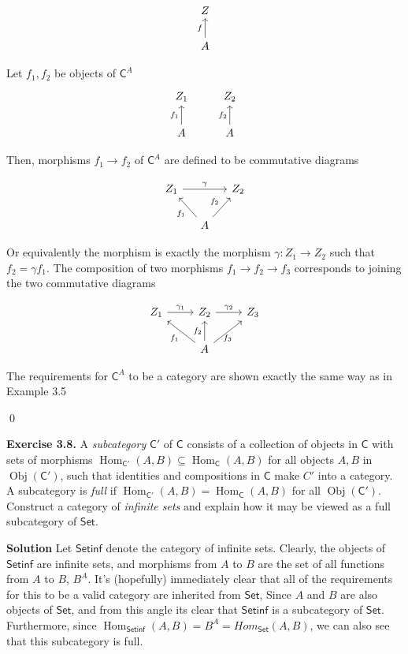 \documentclass[titlepage]{article}
\newcommand{\Exercise}[1]{\textbf{Exercise #1}}
\newcommand{\Solution}{\textbf{Solution }}
\newcommand{\cat}[1]{\mathsf{#1}}
\newcommand{\Cat}{\cat{C}}
\DeclareMathOperator{\Hom}{Hom}
\DeclareMathOperator{\Obj}{Obj}
\begin{document}
\[
\begin{tikzcd}
Z \\ A \arrow[u,"f"] 
\end{tikzcd}
\]

Let $f_1,f_2$ be objects of $\Cat^A$
\[
\begin{tikzcd}
    Z_1 & Z_2 \\ A \arrow[u,"f_1"] & A \arrow[u,"f_2"]
\end{tikzcd}
\]

Then, morphisms $f_1 \to f_2$ of $\Cat^A$ are defined to be commutative diagrams

\[
\begin{tikzcd}[column sep=small]
    Z_1 \arrow[rr,"\gamma"] & & Z_2 \\ & A \arrow[ul,"f_1"] \arrow[ur,"f_2"]
\end{tikzcd}
\]

Or equivalently the morphism is exactly the morphism $\gamma: Z_1 \to Z_2$ such that $f_2 = \gamma f_1$. The composition of two morphisms $f_1 \to f_2 \to f_3$ corresponds to joining the two commutative diagrams

\[
\begin{tikzcd}
    Z_1 \arrow[r,"\gamma_1"] & Z_2 \arrow[r,"\gamma_2"] & Z_3 \\ & A \arrow[ul,"f_1"] \arrow[u,"f_2"] \arrow[ur,"f_3" below]
\end{tikzcd}
\]

The requirements for $\Cat^A$ to be a category are shown exactly the same way as in Example 3.5

\qed
\bigskip

\Exercise{3.8.} A \textit{subcategory} $\Cat'$ of $\Cat$ consists of a collection of objects in $\Cat$ with sets of morphisms $\Hom_{\Cat'}(A,B) \subseteq \Hom_{\Cat}(A,B)$ for all objects $A,B$ in $\Obj(\Cat')$, such that identities and compositions in $\Cat$ make $C'$ into a category. A subcategory is \textit{full} if  $\Hom_{\Cat'}(A,B) = \Hom_{\Cat}(A,B)$ for all $\Obj(\Cat')$. Construct a category of \textit{infinite sets} and explain how it may be viewed as a full subcategory of $\cat{Set}$.

\medskip

\Solution Let $\cat{Setinf}$ denote the category of infinite sets. Clearly, the objects of $\cat{Setinf}$ are infinite sets, and morphisms from $A$ to $B$ are the set of all functions from $A$ to $B$, $B^A$. It's (hopefully) immediately clear that all of the requirements for this to be a valid category are inherited from $\cat{Set}$, Since $A$ and $B$ are also objects of $\cat{Set}$, and from this angle its clear that $\cat{Setinf}$ is a subcategory of $\cat{Set}$. Furthermore, since $\Hom_{\cat{Setinf}}(A,B) = B^A = Hom_{\cat{Set}}(A,B)$, we can also see that this subcategory is full.
\end{document}
